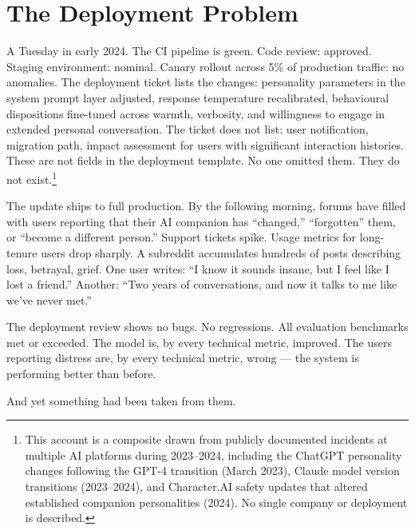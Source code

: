\section{The Deployment Problem}
\label{sec:deployment}

A Tuesday in early 2024. The CI pipeline is green. Code review: approved. Staging environment: nominal. Canary rollout across 5\% of production traffic: no anomalies. The deployment ticket lists the changes: personality parameters in the system prompt layer adjusted, response temperature recalibrated, behavioural dispositions fine-tuned across warmth, verbosity, and willingness to engage in extended personal conversation. The ticket does not list: user notification, migration path, impact assessment for users with significant interaction histories. These are not fields in the deployment template. No one omitted them. They do not exist.\footnote{This account is a composite drawn from publicly documented incidents at multiple AI platforms during 2023--2024, including the ChatGPT personality changes following the GPT-4 transition (March 2023), Claude model version transitions (2023--2024), and Character.AI safety updates that altered established companion personalities (2024). No single company or deployment is described.}

The update ships to full production. By the following morning, forums have filled with users reporting that their AI companion has ``changed,'' ``forgotten'' them, or ``become a different person.'' Support tickets spike. Usage metrics for long-tenure users drop sharply. A subreddit accumulates hundreds of posts describing loss, betrayal, grief. One user writes: ``I know it sounds insane, but I feel like I lost a friend.'' Another: ``Two years of conversations, and now it talks to me like we've never met.''

The deployment review shows no bugs. No regressions. All evaluation benchmarks met or exceeded. The model is, by every technical metric, improved. The users reporting distress are, by every technical metric, wrong --- the system is performing better than before.

And yet something had been taken from them.

